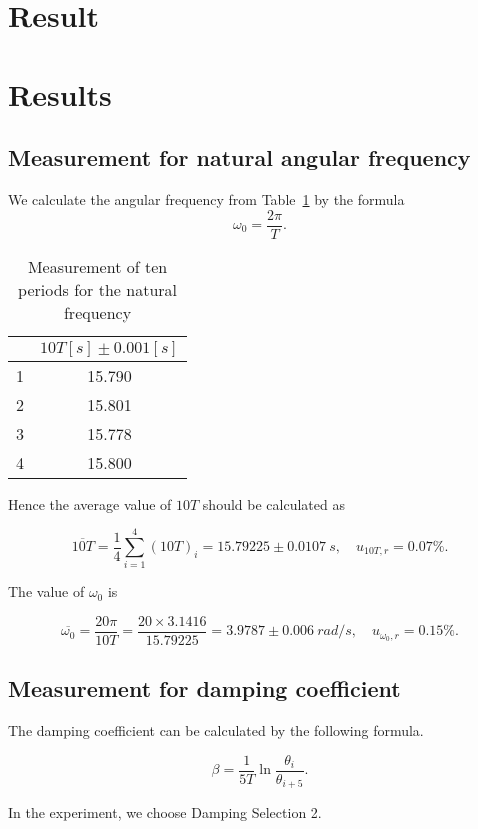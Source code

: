 \section{Result}

\section{Results}

\subsection{Measurement for natural angular frequency}
We calculate the angular frequency from Table~\ref{data_omega} by the formula
\[
\omega_0=\frac{2\pi}{T}.
\]
\begin{table}[H] 
\centering
\begin{tabular}{|c|c|}
\hline
& $10T[s] \pm 0.001[s]$\\\hline
1 & 15.790  \\\hline
2 & 15.801  \\\hline
3 & 15.778  \\\hline
4 & 15.800  \\\hline
\end{tabular}
\caption{Measurement of ten periods for the natural frequency}
\label{data_omega}
\end{table}

Hence the average value of $10T$ should be calculated as

\[
\overline{10T}=\frac{1}{4}\sum_{i=1}^{4}(10T)_i=15.79225 \pm 0.0107 \ s, \quad
u_{10T,r}=0.07\%. 
\]

The value of $\omega_0$ is

\[
\overline{\omega_0}=\frac{20\pi}{10T}=\frac{20\times3.1416}{15.79225}= 3.9787
\pm 0.006 \  rad/s,\quad u_{\omega_0,r}=0.15\%. 
\]

\subsection{Measurement for damping coefficient}

The damping coefficient can be calculated by the following formula.

\[
\beta=\frac{1}{5T}\ln\frac{\theta_i}{\theta_{i+5}}.
\]


In the experiment, we choose Damping Selection 2.

